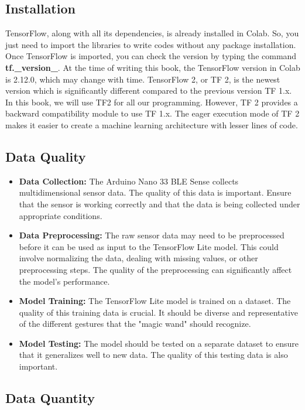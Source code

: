 \subsection{Installation}

TensorFlow, along with all its dependencies, is already installed in Colab. So, you just need to import the libraries to write codes without any package installation. 
Once TensorFlow is imported, you can check the version by typing the command \textbf{tf.\_version\_}. At the time of writing this book, the TensorFlow version in Colab is 2.12.0, which may change with time. TensorFlow 2, or TF 2, is the newest version which is significantly different compared to the previous version TF 1.x. In this book, we will use TF2 for all our programming. However, TF 2 provides a backward compatibility module to use TF 1.x. The eager execution mode of TF 2 makes it easier to create a machine learning architecture with lesser lines of code. 

\subsection{Data Quality}

\begin{itemize}
	\item \textbf{Data Collection:} The Arduino Nano 33 BLE Sense collects multidimensional sensor data. The quality of this data is important. Ensure that the sensor is working correctly and that the data is being collected under appropriate conditions.
	\item \textbf{Data Preprocessing:} The raw sensor data may need to be preprocessed before it can be used as input to the TensorFlow Lite model. This could involve normalizing the data, dealing with missing values, or other preprocessing steps. The quality of the preprocessing can significantly affect the model's performance.
	\item \textbf{Model Training:} The TensorFlow Lite model is trained on a dataset. The quality of this training data is crucial. It should be diverse and representative of the different gestures that the "magic wand" should recognize.
	\item \textbf{Model Testing:} The model should be tested on a separate dataset to ensure that it generalizes well to new data. The quality of this testing data is also important.
\end{itemize}

\subsection{Data Quantity}

